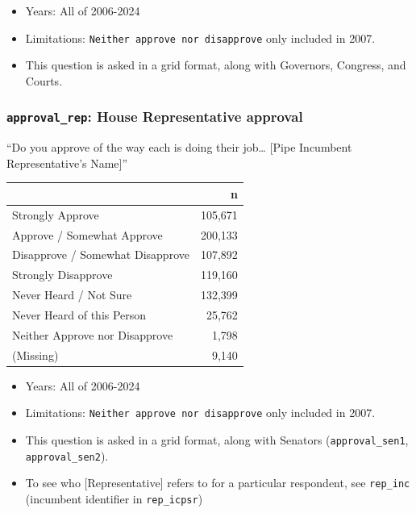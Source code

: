 \documentclass[10pt,article,oneside]{memoir}
\begin{document}
\begin{itemize}
\tightlist
\item
  Years: All of 2006-2024
\item
  Limitations: \texttt{Neither\ approve\ nor\ disapprove} only included
  in 2007.
\item
  This question is asked in a grid format, along with Governors,
  Congress, and Courts.
\end{itemize}

\subsubsection{\texorpdfstring{\texttt{approval\_rep}: House
Representative
approval}{approval\_rep: House Representative approval}}\label{approval_rep-house-representative-approval}

``Do you approve of the way each is doing their job\ldots{} {[}Pipe
Incumbent Representative's Name{]}''

\begin{table}[H]
\centering
\begin{tabular}[t]{lr}
\toprule
 & n\\
\midrule
Strongly Approve & 105,671\\
Approve / Somewhat Approve & 200,133\\
Disapprove / Somewhat Disapprove & 107,892\\
Strongly Disapprove & 119,160\\
Never Heard / Not Sure & 132,399\\
Never Heard of this Person & 25,762\\
Neither Approve nor Disapprove & 1,798\\
(Missing) & 9,140\\
\bottomrule
\end{tabular}
\end{table}

\begin{itemize}
\tightlist
\item
  Years: All of 2006-2024
\item
  Limitations: \texttt{Neither\ approve\ nor\ disapprove} only included
  in 2007.
\item
  This question is asked in a grid format, along with Senators
  (\texttt{approval\_sen1}, \texttt{approval\_sen2}).
\item
  To see who {[}Representative{]} refers to for a particular respondent,
  see \texttt{rep\_inc} (incumbent identifier in \texttt{rep\_icpsr})
\end{itemize}
\end{document}
